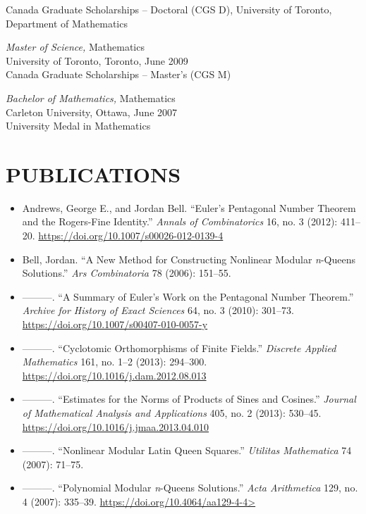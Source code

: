 \documentclass[margin, 10pt]{res} %
\begin{document}
\begin{resume}
Canada Graduate Scholarships – Doctoral (CGS D), University of Toronto, Department of Mathematics

{\sl Master of Science,} Mathematics \\
University of Toronto, Toronto, June 2009\\
Canada Graduate Scholarships – Master's (CGS M)

{\sl Bachelor of Mathematics,} Mathematics \\
Carleton University, Ottawa, June 2007\\
University Medal in Mathematics



\section{PUBLICATIONS}



\begin{itemize}
\item Andrews, George E., and Jordan Bell. “Euler’s Pentagonal Number Theorem and the Rogers-Fine Identity.” {\em Annals of Combinatorics} 16, no. 3 (2012): 411–20. \url{https://doi.org/10.1007/s00026-012-0139-4}

\item Bell, Jordan. “A New Method for Constructing Nonlinear Modular {\em n}-Queens Solutions.” {\em Ars Combinatoria} 78 (2006): 151–55.

\item ———. “A Summary of Euler’s Work on the Pentagonal Number Theorem.” {\em Archive for History of Exact Sciences} 64, no. 3 (2010): 301–73. \url{https://doi.org/10.1007/s00407-010-0057-y}

\item ———. “Cyclotomic Orthomorphisms of Finite Fields.” {\em Discrete Applied Mathematics} 161, no. 1–2 (2013): 294–300. \url{https://doi.org/10.1016/j.dam.2012.08.013}

\item ———. “Estimates for the Norms of Products of Sines and Cosines.” {\em Journal of Mathematical Analysis and Applications} 405, no. 2 (2013): 530–45. \url{https://doi.org/10.1016/j.jmaa.2013.04.010}

\item ———. “Nonlinear Modular Latin Queen Squares.” {\em Utilitas Mathematica} 74 (2007): 71–75.

\item ———. “Polynomial Modular {\em n}-Queens Solutions.” {\em Acta Arithmetica} 129, no. 4 (2007): 335–39. \url{https://doi.org/10.4064/aa129-4-4>}


\end{itemize}
\end{resume}
\end{document}
